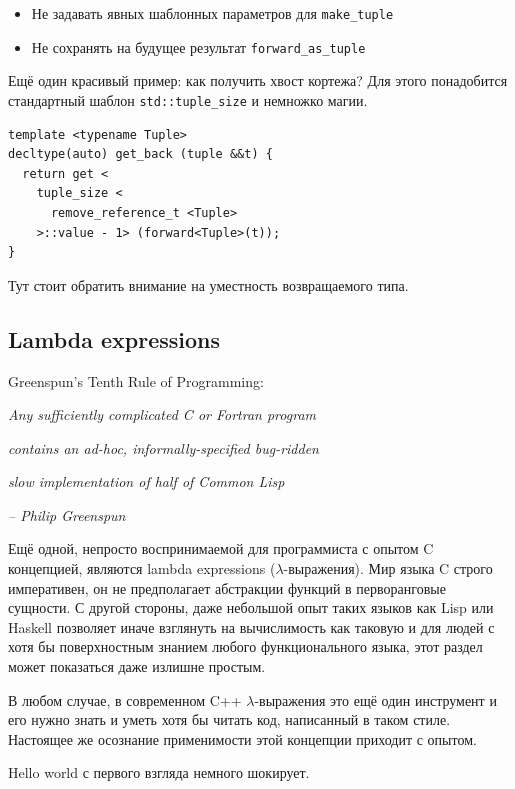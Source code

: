 \documentclass[a4paper,12pt,oneside]{article}
\begin{document}
\begin{itemize}
\item Не задавать явных шаблонных параметров для \lstinline!make_tuple! 
\item Не сохранять на будущее результат \lstinline!forward_as_tuple!
\end{itemize}

Ещё один красивый пример: как получить хвост кортежа? Для этого понадобится стандартный шаблон \lstinline!std::tuple_size! и немножко магии.

\begin{lstlisting}
template <typename Tuple>
decltype(auto) get_back (tuple &&t) {
  return get < 
    tuple_size <
      remove_reference_t <Tuple>
    >::value - 1> (forward<Tuple>(t));
}
\end{lstlisting}

Тут стоит обратить внимание на уместность возвращаемого типа.

\pagebreak
\subsection{Lambda expressions}\label{LambdaExpressions}

\hfill{Greenspun's Tenth Rule of Programming:}

\hfill\textit{Any sufficiently complicated C or Fortran program}

\hfill\textit{contains an ad-hoc, informally-specified bug-ridden}

\hfill\textit{slow implementation of half of Common Lisp}{\vspace{0.5em}}

\hfill\textit{-- Philip Greenspun}

Ещё одной, непросто воспринимаемой для программиста с опытом C концепцией, являются lambda expressions ($\lambda$-выражения). Мир языка C строго императивен, он не предполагает абстракции функций в перворанговые сущности. С другой стороны, даже небольшой опыт таких языков как Lisp или Haskell позволяет иначе взглянуть на вычислимость как таковую и для людей с хотя бы поверхностным знанием любого функционального языка, этот раздел может показаться даже излишне простым.

В любом случае, в современном C++ $\lambda$-выражения это ещё один инструмент и его нужно знать и уметь хотя бы читать код, написанный в таком стиле. Настоящее же осознание применимости этой концепции приходит с опытом. 

Hello world с первого взгляда немного шокирует.
\end{document}
